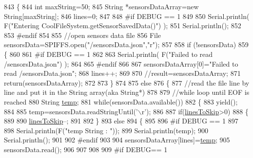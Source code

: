\begin{DoxyCode}
843 \{
844     \textcolor{keywordtype}{int} maxString=50;
845     String *sensorsDataArray=\textcolor{keyword}{new} String[maxString];
846     lines=0;
847 
848 \textcolor{preprocessor}{#if DEBUG == 1 }
849 
850     Serial.println( F(\textcolor{stringliteral}{"Entering CoolFileSystem.getSensorSavedData()"}) );
851     Serial.println();
852 
853 \textcolor{preprocessor}{#endif}
854 
855     \textcolor{comment}{//open sensors data file}
856     File sensorsData=SPIFFS.open(\textcolor{stringliteral}{"/sensorsData.json"},\textcolor{stringliteral}{"r"});
857     
858     \textcolor{keywordflow}{if} (!sensorsData)
859     \{
860 
861 \textcolor{preprocessor}{    #if DEBUG == 1 }
862 
863         Serial.println( F(\textcolor{stringliteral}{"Failed to read /sensorsData.json"}) );
864 
865 \textcolor{preprocessor}{    #endif}
866          
867         sensorsDataArray[0]=\textcolor{stringliteral}{"Failed to read /sensorsData.json"};
868         lines++;
869 
870         \textcolor{comment}{//result=sensorsDataArray;}
871         \textcolor{keywordflow}{return}(sensorsDataArray);
872 
873     \}
874 
875     \textcolor{keywordflow}{else}
876     \{
877         \textcolor{comment}{//read the file line by line and put it in the String array(aka String*)        }
878 
879         \textcolor{comment}{//while loop until EOF is reached}
880         String \hyperlink{_irene3000_8h_a5905d48604152cf57aa6bfa087b49173}{temp};
881         \textcolor{keywordflow}{while}(sensorsData.available())
882         \{
883             yield();
884             
885             temp=sensorsData.readStringUntil(\textcolor{charliteral}{'\(\backslash\)r'});
886 
887             \textcolor{keywordflow}{if}(\hyperlink{class_cool_file_system_a84fdb6057e534b395512463daa28ea3c}{linesToSkip}>0)
888             \{
889 
890                 \hyperlink{class_cool_file_system_a84fdb6057e534b395512463daa28ea3c}{linesToSkip}--;
891         
892             \}
893             \textcolor{keywordflow}{else}
894             \{
895 
896 \textcolor{preprocessor}{            #if DEBUG == 1}
897 
898                 Serial.println(F(\textcolor{stringliteral}{"temp String : "}));
899                 Serial.println(temp);
900                 Serial.println();
901             
902 \textcolor{preprocessor}{            #endif}
903             
904                 sensorsDataArray[lines]=\hyperlink{_irene3000_8h_a5905d48604152cf57aa6bfa087b49173}{temp};
905                 sensorsData.read();
906             
907             
908         
909 \textcolor{preprocessor}{            #if DEBUG== 1}

\end{DoxyCode}
